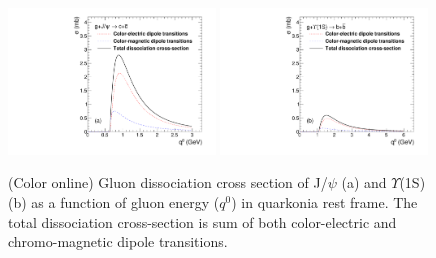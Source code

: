 \documentclass[12pt,a4paper,final]{iopart} %
\begin{document}
 
\begin{figure}
\includegraphics[width=0.49\textwidth]{Fig1a_JPsi_SigmaDq0.pdf}
\includegraphics[width=0.49\textwidth]{Fig1b_Y1S_SigmaDq0.pdf}
\caption{(Color online) Gluon dissociation cross section of J/$\psi$ (a) and $\Upsilon$(1S) (b) as a function of gluon energy
    ($q^{0}$) in quarkonia rest frame. The total dissociation cross-section is sum of both color-electric and chromo-magnetic dipole 
    transitions.}
\label{fig:SigmaDQ0}
\end{figure}
\end{document}
